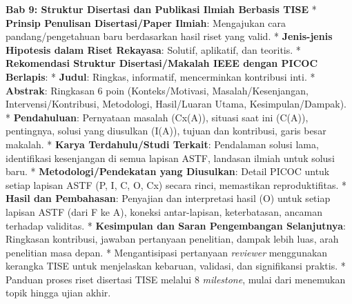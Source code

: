 \documentclass[
  letterpaper,
  DIV=11,
  numbers=noendperiod]{scrreprt}
\begin{document}
\textbf{Bab 9: Struktur Disertasi dan Publikasi Ilmiah Berbasis TISE} *
\textbf{Prinsip Penulisan Disertasi/Paper Ilmiah}: Mengajukan cara
pandang/pengetahuan baru berdasarkan hasil riset yang valid. *
\textbf{Jenis-jenis Hipotesis dalam Riset Rekayasa}: Solutif, aplikatif,
dan teoritis. * \textbf{Rekomendasi Struktur Disertasi/Makalah IEEE
dengan PICOC Berlapis}: * \textbf{Judul}: Ringkas, informatif,
mencerminkan kontribusi inti. * \textbf{Abstrak}: Ringkasan 6 poin
(Konteks/Motivasi, Masalah/Kesenjangan, Intervensi/Kontribusi,
Metodologi, Hasil/Luaran Utama, Kesimpulan/Dampak). *
\textbf{Pendahuluan}: Pernyataan masalah (Cx(A)), situasi saat ini
(C(A)), pentingnya, solusi yang diusulkan (I(A)), tujuan dan kontribusi,
garis besar makalah. * \textbf{Karya Terdahulu/Studi Terkait}:
Pendalaman solusi lama, identifikasi kesenjangan di semua lapisan ASTF,
landasan ilmiah untuk solusi baru. * \textbf{Metodologi/Pendekatan yang
Diusulkan}: Detail PICOC untuk setiap lapisan ASTF (P, I, C, O, Cx)
secara rinci, memastikan reproduktifitas. * \textbf{Hasil dan
Pembahasan}: Penyajian dan interpretasi hasil (O) untuk setiap lapisan
ASTF (dari F ke A), koneksi antar-lapisan, keterbatasan, ancaman
terhadap validitas. * \textbf{Kesimpulan dan Saran Pengembangan
Selanjutnya}: Ringkasan kontribusi, jawaban pertanyaan penelitian,
dampak lebih luas, arah penelitian masa depan. * Mengantisipasi
pertanyaan \emph{reviewer} menggunakan kerangka TISE untuk menjelaskan
kebaruan, validasi, dan signifikansi praktis. * Panduan proses riset
disertasi TISE melalui 8 \emph{milestone}, mulai dari menemukan topik
hingga ujian akhir.
\end{document}
